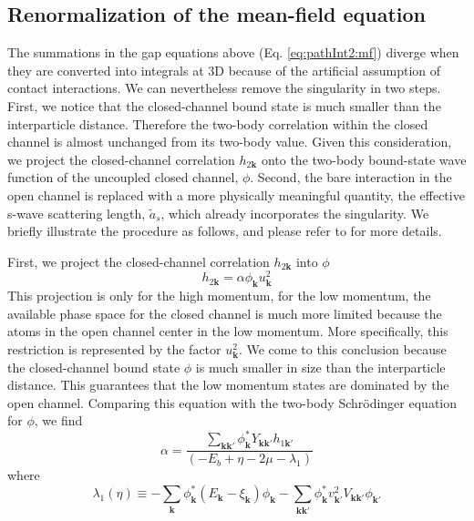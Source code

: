 \documentclass[reprint,pra]{revtex4-1}
\newcommand{\vk}{\ensuremath{\mathbf{k}}}
\providecommand{\sch}{{Schr\"{o}dinger }}
\newcommand{\br}[1]{\ensuremath{\left(#1\right)}}
\begin{document}
 
 \subsection{Renormalization of the mean-field equation}
    The summations in the gap equations above (Eq. \ref{eq:pathInt2:mf}) diverge when they are converted into integrals at 3D because of the artificial assumption of contact interactions. 
We can nevertheless remove the singularity in two steps.  First, we notice that the closed-channel bound state is much smaller than the interparticle distance. Therefore the two-body correlation within the closed channel is almost unchanged from its two-body value.  Given this consideration, we project the closed-channel correlation $h_{2\vk}$  onto the two-body  bound-state wave function of the uncoupled closed channel, $\phi$.  Second, the bare interaction in the open channel is replaced with a more physically meaningful quantity, the effective s-wave scattering length, $\tilde{a}_s$, which already incorporates the singularity. We briefly illustrate the procedure as follows, and please refer to \cite{Zhuthesis} for more details. 

 First, we project the closed-channel correlation $h_{2\vk}$ into  $\phi$
\begin{equation}\label{eq:pathInt2:hphi}
h_{2\vk}=\alpha\phi^{}_{\vk}u_{\vk}^{2}
\end{equation}
This projection is only for the high momentum, for the low momentum, the available phase space for the closed channel is much more limited because the atoms in the open channel center in the low momentum.  More specifically, this restriction is represented by the factor $u_{\vk}^2$.  We come to this conclusion because the closed-channel bound state $\phi$ is much smaller in size than the interparticle distance.  This guarantees that the low momentum states are dominated by the open channel.  
Comparing this equation with the two-body \sch equation for $\phi$, we find
\begin{equation}\label{eq:pathInt2:alpha}
\alpha=\frac{\sum_{\vk\vk'}{\phi_{\vk}^{*}}{Y_{\vk\vk'}}{h_{1\vk'}}}{\br{-E_{b}+\eta-2\mu-\lambda_{1}}}
\end{equation}
where
\begin{equation}\label{eq:pathInt2:lambda1}
\lambda_{1}(\eta)\equiv-\sum_{\vk}{\phi_{\vk}^{*}}{(E_{\vk}-\xi_{\vk})}\phi_{\vk}
	-\sum_{\vk\vk'}{\phi_{\vk}^{*}}{v_{\vk'}^{2}V_{\vk\vk'}}\phi_{\vk'}
\end{equation}
\end{document}
